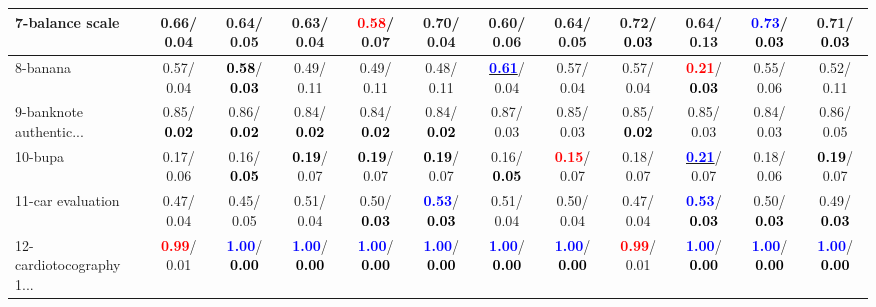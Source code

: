 \begin{table}[h]
\begin{center}
{\begin{tabular}{lc|c|c|c|c|c|c|c|c|c|c}
7-balance scale &   0.66/  0.04 &   0.64/  0.05 &   0.63/  0.04 & \textcolor{red}{\textbf{  0.58}}/  0.07 &   0.70/  0.04 &   0.60/  0.06 &   0.64/  0.05 &   0.72/\textcolor{black}{\textbf{  0.03}} &   0.64/  0.13 & \textcolor{blue}{\textbf{  0.73}}/\textcolor{black}{\textbf{  0.03}} &   0.71/\textcolor{black}{\textbf{  0.03}} \\ \hline
8-banana &   0.57/  0.04 & \textcolor{black}{\textbf{  0.58}}/\textcolor{black}{\textbf{  0.03}} &   0.49/  0.11 &   0.49/  0.11 &   0.48/  0.11 & \underline{\textcolor{blue}{\textbf{  0.61}}}/  0.04 &   0.57/  0.04 &   0.57/  0.04 & \textcolor{red}{\textbf{  0.21}}/\textcolor{black}{\textbf{  0.03}} &   0.55/  0.06 &   0.52/  0.11 \\
9-banknote authentic... &   0.85/\textcolor{black}{\textbf{  0.02}} &   0.86/\textcolor{black}{\textbf{  0.02}} &   0.84/\textcolor{black}{\textbf{  0.02}} &   0.84/\textcolor{black}{\textbf{  0.02}} &   0.84/\textcolor{black}{\textbf{  0.02}} &   0.87/  0.03 &   0.85/  0.03 &   0.85/\textcolor{black}{\textbf{  0.02}} &   0.85/  0.03 &   0.84/  0.03 &   0.86/  0.05 \\
10-bupa &   0.17/  0.06 &   0.16/\textcolor{black}{\textbf{  0.05}} & \textcolor{black}{\textbf{  0.19}}/  0.07 & \textcolor{black}{\textbf{  0.19}}/  0.07 & \textcolor{black}{\textbf{  0.19}}/  0.07 &   0.16/\textcolor{black}{\textbf{  0.05}} & \textcolor{red}{\textbf{  0.15}}/  0.07 &   0.18/  0.07 & \underline{\textcolor{blue}{\textbf{  0.21}}}/  0.07 &   0.18/  0.06 & \textcolor{black}{\textbf{  0.19}}/  0.07 \\
11-car evaluation &   0.47/  0.04 &   0.45/  0.05 &   0.51/  0.04 &   0.50/\textcolor{black}{\textbf{  0.03}} & \textcolor{blue}{\textbf{  0.53}}/\textcolor{black}{\textbf{  0.03}} &   0.51/  0.04 &   0.50/  0.04 &   0.47/  0.04 & \textcolor{blue}{\textbf{  0.53}}/\textcolor{black}{\textbf{  0.03}} &   0.50/\textcolor{black}{\textbf{  0.03}} &   0.49/\textcolor{black}{\textbf{  0.03}} \\
12-cardiotocography 1... & \textcolor{red}{\textbf{  0.99}}/  0.01 & \textcolor{blue}{\textbf{  1.00}}/\textcolor{black}{\textbf{  0.00}} & \textcolor{blue}{\textbf{  1.00}}/\textcolor{black}{\textbf{  0.00}} & \textcolor{blue}{\textbf{  1.00}}/\textcolor{black}{\textbf{  0.00}} & \textcolor{blue}{\textbf{  1.00}}/\textcolor{black}{\textbf{  0.00}} & \textcolor{blue}{\textbf{  1.00}}/\textcolor{black}{\textbf{  0.00}} & \textcolor{blue}{\textbf{  1.00}}/\textcolor{black}{\textbf{  0.00}} & \textcolor{red}{\textbf{  0.99}}/  0.01 & \textcolor{blue}{\textbf{  1.00}}/\textcolor{black}{\textbf{  0.00}} & \textcolor{blue}{\textbf{  1.00}}/\textcolor{black}{\textbf{  0.00}} & \textcolor{blue}{\textbf{  1.00}}/\textcolor{black}{\textbf{  0.00}} \\

\end{tabular}}
\end{center}
\end{table}
